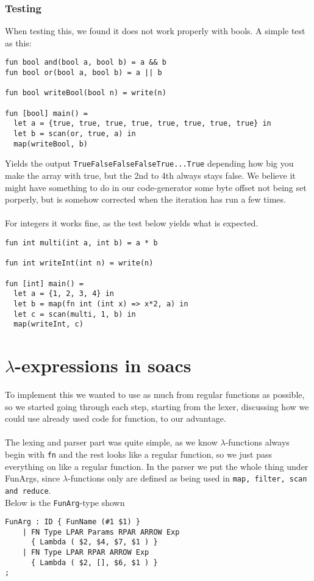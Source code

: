 \documentclass[paper=a4, fontsize=11pt]{scrartcl} %
\numberwithin{equation}{section} %
\numberwithin{figure}{section} %
\numberwithin{table}{section} %
\begin{document}
\subsubsection{Testing}
When testing this, we found it does not work properly with bools. A simple test as this:
\begin{lstlisting}
fun bool and(bool a, bool b) = a && b
fun bool or(bool a, bool b) = a || b

fun bool writeBool(bool n) = write(n)

fun [bool] main() =
  let a = {true, true, true, true, true, true, true, true} in
  let b = scan(or, true, a) in
  map(writeBool, b)
\end{lstlisting}
 Yields the output \verb"TrueFalseFalseFalseTrue...True" depending how big you make the array with true, but the 2nd to 4th always stays false. We believe it might have something to do in our code-generator some byte offset not being set porperly, but is somehow corrected when the iteration has run a few times.\\\\
For integers it works fine, as the test below yields what is expected.
\begin{lstlisting}
fun int multi(int a, int b) = a * b

fun int writeInt(int n) = write(n)

fun [int] main() =
  let a = {1, 2, 3, 4} in
  let b = map(fn int (int x) => x*2, a) in 
  let c = scan(multi, 1, b) in
  map(writeInt, c)
\end{lstlisting}
\section{$\lambda$-expressions in soacs}

To implement this we wanted to use as much from regular functions as possible, so we started going through each step, starting from the lexer, discussing how we could use already used code for function, to our advantage.\\\\
The lexing and parser part was quite simple, as we know $\lambda$-functions always begin with \verb"fn" and the rest looks like a regular function, so we just pass everything on like a regular function. In the parser we put the whole thing under FunArgs, since $\lambda$-functions only are defined as being used in \verb"map, filter, scan and reduce".\\
Below is the \verb"FunArg"-type shown
\begin{lstlisting}
FunArg : ID { FunName (#1 $1) }
    | FN Type LPAR Params RPAR ARROW Exp
      { Lambda ( $2, $4, $7, $1 ) }
    | FN Type LPAR RPAR ARROW Exp
      { Lambda ( $2, [], $6, $1 ) }
;
\end{lstlisting}
\end{document}
